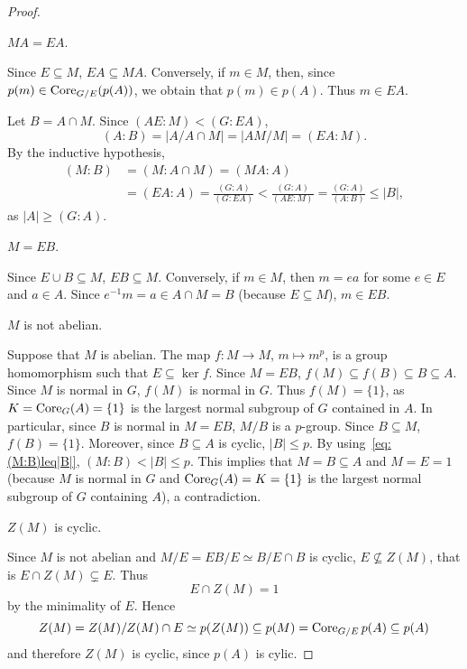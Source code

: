 \begin{proof}
	\begin{claim}
		$MA=EA$. 
	\end{claim}

	Since $E\subseteq M$, $EA\subseteq MA$. Conversely, if $m\in M$, 
	then, since $p(m)\in\operatorname{Core}_{G/E}(p(A))$, we obtain that 
	$p(m)\in p(A)$. Thus $m\in EA$. 

	\medskip
	Let $B=A\cap M$. Since $(AE:M)<(G:EA)$, 
	\[
	(A:B)=|A/A\cap M|=|AM/M|=(EA:M).
	\]
	By the inductive hypothesis, 
	\begin{equation}
		\label{eq:(M:B)leq|B|}
	\begin{aligned}
		(M:B)&=(M:A\cap M)=(MA:A)\\
		&=(EA:A)
		=\frac{(G:A)}{(G:EA)}
		<\frac{(G:A)}{(AE:M)}
		=\frac{(G:A)}{(A:B)}\leq |B|, 
	\end{aligned}
	\end{equation}
	as $|A|\geq (G:A)$. 

	\begin{claim}
		$M=EB$.
	\end{claim}

	Since $E\cup B\subseteq M$, $EB\subseteq M$. Conversely, if 
	$m\in M$, then $m=ea$ for some $e\in E$ and $a\in A$. Since $e^{-1}m=a\in
	A\cap M=B$ (because $E\subseteq M$), $m\in EB$.

	\begin{claim}
		$M$ is not abelian. 
	\end{claim}

	Suppose that $M$ is abelian. The map $f\colon M\to M$, $m\mapsto
	m^p$, is a group homomorphism such that $E \subseteq\ker f$. Since $M=EB$,
	$f(M)\subseteq f(B)\subseteq B\subseteq A$. Since $M$ is normal in $G$,
	$f(M)$ is normal in $G$. Thus $f(M)=\{1\}$, as $K=\operatorname{Core}_G(A)=\{1\}$ is the largest normal subgroup of $G$ contained in $A$. In particular, since $B$ is normal in $M=EB$, $M/B$ is a $p$-group. Since $B\subseteq M$,  $f(B)=\{1\}$. Moreover, since 
	$B\subseteq A$ is cyclic, $|B|\leq p$. By using~\eqref{eq:(M:B)leq|B|}, 
	$(M:B)<|B|\leq p$. This implies that $M=B\subseteq A$ and $M=E=1$ (because 
	$M$ is normal in $G$ and $\operatorname{Core}_G(A)=K=\{1\}$ is the largest normal subgroup of $G$ containing $A$), a contradiction. 
	
	\begin{claim}
		$Z(M)$  is cyclic. 
	\end{claim}

	Since $M$ is not abelian and $M/E=EB/E\simeq B/E\cap B$ is cyclic,
	$E\not\subseteq Z(M)$, that is $E\cap
	Z(M)\subsetneq E$. Thus  
	\begin{equation}
		\label{equation:EcapZ(M)}
		E\cap Z(M)=1
	\end{equation}
	by the minimality of $E$. Hence  
	\[
	Z(M)=Z(M)/Z(M)\cap E\simeq p(Z(M))\subseteq p(M)=\operatorname{Core}_{G/E}p(A)\subseteq p(A)
	\]
	and therefore $Z(M)$ is cyclic, since $p(A)$ is cylic. 


\end{proof}
